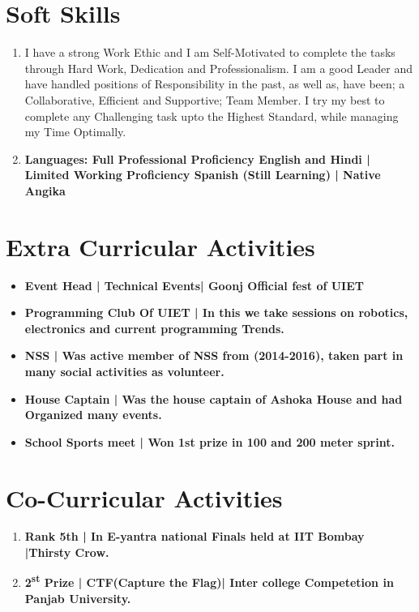 \documentclass[11pt]{article}
\begin{document}
\begin{minipage}{18cm}

\fontsize{10pt}{13pt}\selectfont
\section{Soft Skills}
\begin{enumerate}[leftmargin=*]
\item  I have a strong Work Ethic and I am Self-Motivated to complete the tasks through Hard Work, Dedication and Professionalism. I am a good Leader and have handled positions of Responsibility in the past, as well as, have been; a Collaborative, Efficient and Supportive; Team Member. I try my best to complete any Challenging task upto the Highest Standard, while managing my Time Optimally.\\

\item \bfseries Languages: 
Full Professional Proficiency \mdseries English and Hindi | \bfseries Limited Working Proficiency \mdseries Spanish (Still Learning) | \bfseries Native \mdseries Angika
\end{enumerate}

\section{Extra Curricular Activities}
\begin{itemize}[leftmargin=*]
\item \bfseries Event Head \mdseries | Technical Events| Goonj Official fest of UIET
\item \bfseries Programming Club Of UIET  \mdseries | In this we take sessions on robotics, electronics and current programming Trends.
\item \bfseries NSS \mdseries | Was active member of NSS from (2014-2016), taken part in many social activities as volunteer.
  
\item \bfseries House Captain \mdseries | Was the house captain of Ashoka House and had Organized many events.
\item \bfseries School Sports meet \mdseries | Won 1st prize in 100 and 200 meter sprint.
\end{itemize}

\fontsize{10pt}{18pt}\selectfont

\section{Co-Curricular Activities}
\begin{enumerate}[leftmargin=*]
\item \bfseries Rank 5th | \mdseries In E-yantra national Finals held at IIT Bombay |Thirsty Crow.
\item \bfseries 2\textsuperscript{st} Prize \mdseries | CTF(Capture the Flag)| Inter college Competetion in Panjab University.


\end{enumerate}
\end{minipage}
\end{document}
